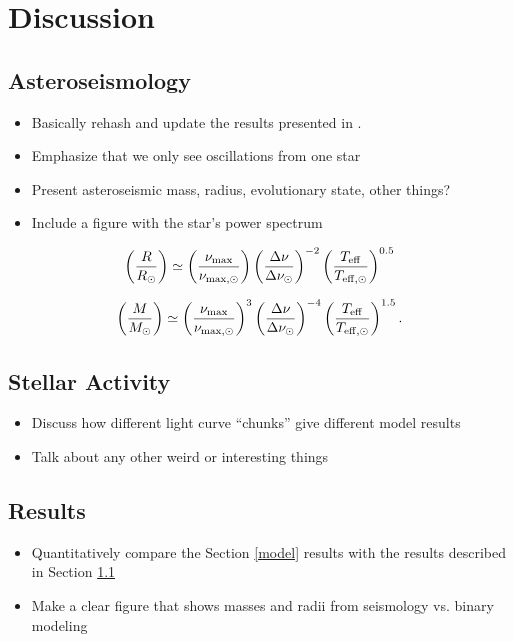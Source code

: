 \section{Discussion}\label{discuss}

\subsection{Asteroseismology}\label{seismo}
\begin{itemize}
\item Basically rehash and update the results presented in \citet{gau14}.
\item Emphasize that we only see oscillations from one star
\item Present asteroseismic mass, radius, evolutionary state, other things?
\item Include a figure with the star's power spectrum
\end{itemize}

\begin{equation}
\left( \frac{R}{R_\odot} \right) \simeq \left( \frac{\nu_{\rm{max}}}{\nu_{\rm{max,\odot}}} \right) \left( \frac{\Delta \nu}{\Delta \nu_\odot} \right)^{-2} \left( \frac{T_{\rm{eff}}}{T_{\rm{eff,\odot}}} \right)^{0.5}
\end{equation}

\begin{equation}
\left( \frac{M}{M_\odot} \right) \simeq \left( \frac{\nu_{\rm{max}}}{\nu_{\rm{max,\odot}}} \right)^3 \left( \frac{\Delta \nu}{\Delta \nu_\odot} \right)^{-4} \left( \frac{T_{\rm{eff}}}{T_{\rm{eff,\odot}}} \right)^{1.5}.
\end{equation}

\subsection{Stellar Activity}
\begin{itemize}
\item Discuss how different light curve ``chunks'' give different model results
\item Talk about any other weird or interesting things
\end{itemize}

\subsection{Results}\label{results}
\begin{itemize}
\item Quantitatively compare the Section \ref{model} results with the \citet{gau14} results described in Section \ref{seismo}
\item Make a clear figure that shows masses and radii from seismology vs. binary modeling
\end{itemize}
